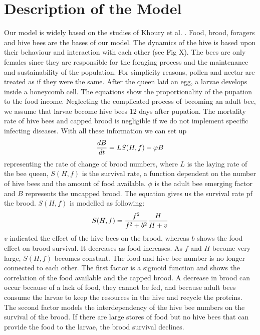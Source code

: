 \section{Description of the Model}
Our model is widely based on the studies of Khoury et al. \cite{khoury13}
. Food, brood, foragers and hive bees are the bases of our model. The dynamics of the hive is based upon their behaviour and interaction with each other (see Fig X). The bees are only females since they are responsible for the foraging process and the maintenance and sustainability of the population. For simplicity reasons, pollen and nectar are treated as if they were the same. After the queen laid an egg, a larvae develops inside a honeycomb cell. The equations show the proportionality of the pupation to the food income. Neglecting the complicated process of becoming an adult bee, we assume that larvae become hive bees 12 days after pupation. The mortality rate of hive bees and capped brood is negligible if we do not implement specific infecting diseases. With all these information we can set up
\begin{equation}\label{rate of change of brood numbers}
{dB \over dt} = LS(H,f)-\phi B
\end{equation}
representing the rate of change of brood numbers, where $L$ is the laying rate of the bee queen, $S(H,f)$ is the survival rate, a function dependent on the number of hive bees and the amount of food available. $\phi$ is the adult bee emerging factor and $B$ represents the uncapped brood. The equation gives us the survival rate pf the brood. $S(H,f)$ is modelled as following:
\begin{equation}\label{function of hive bees and food}
S(H,f)={f^2 \over f^2+b^2}{H \over H+v}
\end{equation}
$v$ indicated the effect of the hive bees on the brood, whereas $b$ shows the food effect on brood survival. It decreases as food increases. As $f$ and $H$ become very large, $S(H,f)$ becomes constant. The food and hive bee number is no longer connected to each other. The first factor is a sigmoid function and shows the correlation of the food available and the capped brood. A decrease in brood can occur because of a lack of food, they cannot be fed, and because adult bees consume the larvae to keep the resources in the hive and recycle the proteins. The second factor models the interdependency of the hive bee numbers on the survival of the brood. If there are large stores of food but no hive bees that can provide the food to the larvae, the brood survival declines.  
